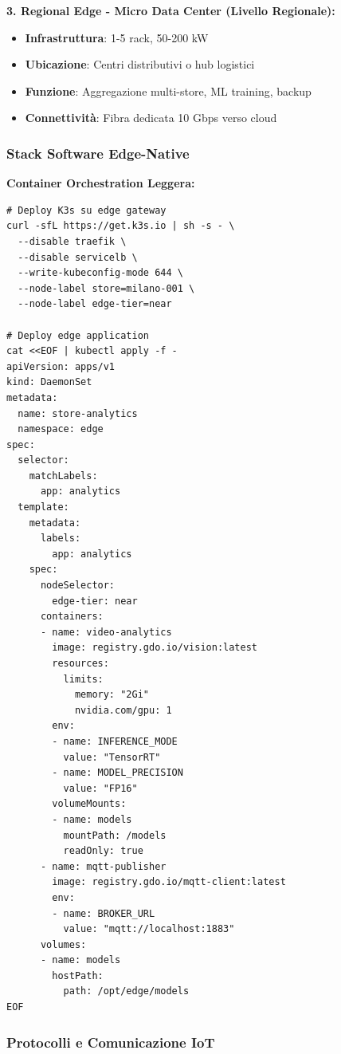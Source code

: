 \textbf{3. Regional Edge - Micro Data Center (Livello Regionale):}
\begin{itemize}
    \item \textbf{Infrastruttura}: 1-5 rack, 50-200 kW
    \item \textbf{Ubicazione}: Centri distributivi o hub logistici
    \item \textbf{Funzione}: Aggregazione multi-store, ML training, backup
    \item \textbf{Connettività}: Fibra dedicata 10 Gbps verso cloud
\end{itemize}

\subsubsection{\texorpdfstring{\textbf{Stack Software Edge-Native}}{3.3.2.2 - Stack Software Edge-Native}}

\textbf{Container Orchestration Leggera:}
\begin{lstlisting}[caption={K3s Deployment per Edge Store},label={lst:k3s_edge}]
# Deploy K3s su edge gateway
curl -sfL https://get.k3s.io | sh -s - \
  --disable traefik \
  --disable servicelb \
  --write-kubeconfig-mode 644 \
  --node-label store=milano-001 \
  --node-label edge-tier=near

# Deploy edge application
cat <<EOF | kubectl apply -f -
apiVersion: apps/v1
kind: DaemonSet
metadata:
  name: store-analytics
  namespace: edge
spec:
  selector:
    matchLabels:
      app: analytics
  template:
    metadata:
      labels:
        app: analytics
    spec:
      nodeSelector:
        edge-tier: near
      containers:
      - name: video-analytics
        image: registry.gdo.io/vision:latest
        resources:
          limits:
            memory: "2Gi"
            nvidia.com/gpu: 1
        env:
        - name: INFERENCE_MODE
          value: "TensorRT"
        - name: MODEL_PRECISION
          value: "FP16"
        volumeMounts:
        - name: models
          mountPath: /models
          readOnly: true
      - name: mqtt-publisher
        image: registry.gdo.io/mqtt-client:latest
        env:
        - name: BROKER_URL
          value: "mqtt://localhost:1883"
      volumes:
      - name: models
        hostPath:
          path: /opt/edge/models
EOF
\end{lstlisting}

\subsubsection{\texorpdfstring{\textbf{Protocolli e Comunicazione IoT}}{3.3.2.3 - Protocolli e Comunicazione IoT}}

